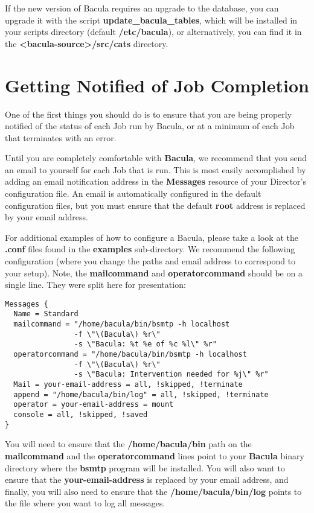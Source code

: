 If the new version of Bacula requires an upgrade to the database,
you can upgrade it with the script {\bf update\_bacula\_tables}, which
will be installed in your scripts directory (default {\bf /etc/bacula}),
or alternatively, you can find it in the
{\bf {\textless}bacula-source{\textgreater}/src/cats} directory.

\section{Getting Notified of Job Completion}
\label{notification}

One of the first things you should do is to ensure that you are being properly
notified of the status of each Job run by Bacula, or at a minimum of each Job
that terminates with an error.

Until you are completely comfortable with {\bf Bacula}, we recommend that you
send an email to yourself for each Job that is run. This is most easily
accomplished by adding an email notification address in the {\bf Messages}
resource of your Director's configuration file. An email is automatically
configured in the default configuration files, but you must ensure that the
default {\bf root} address is replaced by your email address.

For additional examples of how to configure a Bacula, please take a look at the
{\bf .conf} files found in the {\bf examples} sub-directory. We recommend the
following configuration (where you change the paths and email address to
correspond to your setup). Note, the {\bf mailcommand} and {\bf
operatorcommand} should be on a single line. They were split here for
presentation:

\footnotesize
\begin{verbatim}
Messages {
  Name = Standard
  mailcommand = "/home/bacula/bin/bsmtp -h localhost
                -f \"\(Bacula\) %r\"
                -s \"Bacula: %t %e of %c %l\" %r"
  operatorcommand = "/home/bacula/bin/bsmtp -h localhost
                -f \"\(Bacula\) %r\"
                -s \"Bacula: Intervention needed for %j\" %r"
  Mail = your-email-address = all, !skipped, !terminate
  append = "/home/bacula/bin/log" = all, !skipped, !terminate
  operator = your-email-address = mount
  console = all, !skipped, !saved
}
\end{verbatim}
\normalsize

You will need to ensure that the {\bf /home/bacula/bin} path on the {\bf
mailcommand} and the {\bf operatorcommand} lines point to your {\bf Bacula}
binary directory where the {\bf bsmtp} program will be installed. You will
also want to ensure that the {\bf your-email-address} is replaced by your
email address, and finally, you will also need to ensure that the {\bf
/home/bacula/bin/log} points to the file where you want to log all messages.

